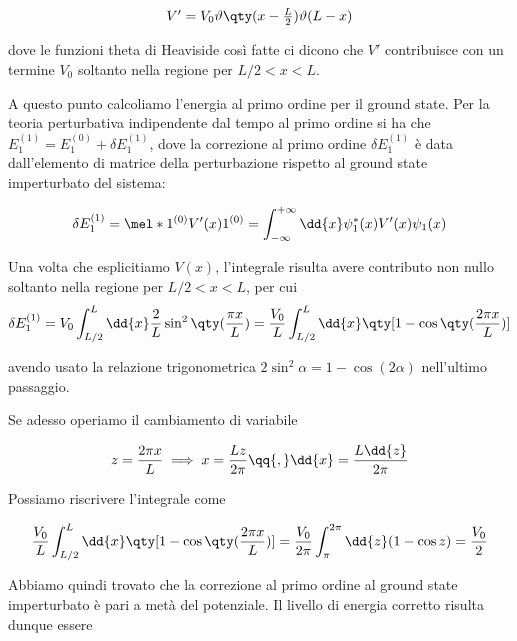 \begin{soluzione}
   \begin{equation*}
      \textstyle V'
      =V_0 \vartheta\qty(x - \frac{L}{2}) \vartheta (L - x)
   \end{equation*}
   
   dove le funzioni theta di Heaviside così fatte ci dicono che $V'$ contribuisce con un termine $V_0$ soltanto nella regione per $L/2<x<L$.
   
   A questo punto calcoliamo l'energia al primo ordine per il ground state. Per la teoria perturbativa indipendente dal tempo al primo ordine si ha che $E_1^{(1)}=E_1^{(0)} + \delta E_1^{(1)}$, dove la correzione al primo ordine $\delta E_1^{(1)}$ è data dall'elemento di matrice della perturbazione rispetto al ground state imperturbato del sistema:
   
   \begin{equation*}
      \delta E_1^{(1)}
      =\mel*{1^{(0)}}{V'(x)}{1^{(0)}}
      =\int_{-\infty}^{+\infty} \dd{x} \psi_1^*(x) V'(x) \psi_1(x)
   \end{equation*}

   Una volta che esplicitiamo $V(x)$, l'integrale risulta avere contributo non nullo soltanto nella regione per $L/2<x<L$, per cui
   \begin{equation*}
      \delta E_1^{(1)}
      =V_0 \int_{L/2}^{L} \dd{x} \frac{2}{L} \sin^2{ \qty( \frac{\pi x}{L} ) }
      =\frac{V_0}{L} \int_{L/2}^{L} \dd{x} \qty[ 1 - \cos{ \qty( \frac{2\pi x}{L} ) } ]
   \end{equation*}

   avendo usato la relazione trigonometrica $2 \sin^2{\alpha}=1 - \cos{(2\alpha)}$ nell'ultimo passaggio.

   Se adesso operiamo il cambiamento di variabile

   \begin{equation*}
      z=\frac{2\pi x}{L}
      \implies
      x=\frac{L z}{2\pi}
      \qq{,}
      \dd{x}=\frac{L \dd{z}}{2\pi}
   \end{equation*}

   Possiamo riscrivere l'integrale come

   \begin{equation*}
      \frac{V_0}{L} \int_{L/2}^{L} \dd{x} \qty[ 1 - \cos{ \qty( \frac{2\pi x}{L} ) } ]
      =\frac{V_0}{2\pi} \int_{\pi}^{2\pi} \dd{z} ( 1 - \cos{z} )
      =\frac{V_0}{2}
   \end{equation*}

   Abbiamo quindi trovato che la correzione al primo ordine al ground state imperturbato è pari a metà del potenziale. Il livello di energia corretto risulta dunque essere


\end{soluzione}

